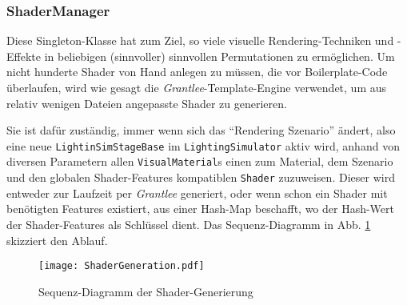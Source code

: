 	
	\subsubsection{ShaderManager}
	Diese Singleton-Klasse hat zum Ziel, so viele visuelle Rendering-Techniken und -Effekte 
	in beliebigen (sinnvoller) sinnvollen Permutationen zu ermöglichen. Um nicht hunderte Shader
	von Hand anlegen zu müssen, die vor Boilerplate-Code überlaufen, wird wie gesagt die
	\emph{Grantlee}-Template-Engine verwendet, um aus relativ wenigen Dateien angepasste Shader zu generieren.
	
	Sie ist dafür zuständig, immer wenn sich das "`Rendering Szenario"' ändert, also eine neue 
	\lstinline|LightinSimStageBase| im \lstinline|LightingSimulator| aktiv wird,  anhand von diversen Parametern
	allen \lstinline|VisualMaterial|s einen zum Material, dem Szenario und den globalen Shader-Features
	kompatiblen \lstinline|Shader| zuzuweisen. Dieser wird entweder zur Laufzeit
	per \emph{Grantlee} generiert, oder wenn schon ein Shader mit benötigten Features existiert, aus einer
	Hash-Map beschafft, wo der Hash-Wert der Shader-Features als Schlüssel dient.
	Das Sequenz-Diagramm in Abb. \ref{fig:shaderGen} skizziert den Ablauf.
	
	\begin{figure}[!h]
	\texttt{[image: ShaderGeneration.pdf]}
	\caption{Sequenz-Diagramm der Shader-Generierung}
	\label{fig:shaderGen}
	\end{figure}
	
